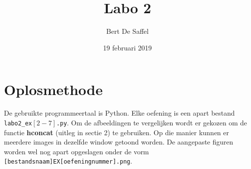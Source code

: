 \documentclass{article}
\begin{document}
	\title{Labo 2}
	\author{Bert De Saffel}
	\date{19 februari 2019}
	\maketitle
	
	\section{Oplosmethode}
	De gebruikte programmeertaal is Python. Elke oefening is een apart bestand \texttt{labo2\_ex$[2-7]$.py}. Om de afbeeldingen te vergelijken wordt er gekozen om de functie \textbf{hconcat} (uitleg in sectie 2) te gebruiken. Op die manier kunnen er meerdere images in dezelfde window getoond worden. De aangepaste figuren worden wel nog apart opgeslagen onder de vorm \texttt{[bestandsnaam]EX[oefeningnummer].png}.
	
\end{document}
